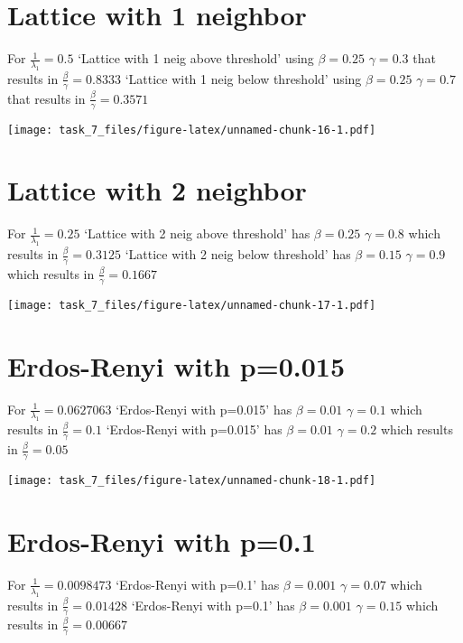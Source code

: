 \documentclass[]{article}
\begin{document}
\section{Lattice with 1 neighbor}\label{lattice-with-1-neighbor}

For \(\frac{1}{\lambda_1} = 0.5\) `Lattice with 1 neig above threshold'
using \(\beta = 0.25\) \(\gamma =0.3\) that results in
\(\frac{\beta}{\gamma} = 0.8333\) `Lattice with 1 neig below threshold'
using \(\beta = 0.25\) \(\gamma =0.7\) that results in
\(\frac{\beta}{\gamma} = 0.3571\)

\texttt{[image: task\_7\_files/figure-latex/unnamed-chunk-16-1.pdf]}

\section{Lattice with 2 neighbor}\label{lattice-with-2-neighbor}

For \(\frac{1}{\lambda_1} = 0.25\) `Lattice with 2 neig above threshold'
has \(\beta = 0.25\) \(\gamma =0.8\) which results in
\(\frac{\beta}{\gamma} = 0.3125\) `Lattice with 2 neig below threshold'
has \(\beta = 0.15\) \(\gamma =0.9\) which results in
\(\frac{\beta}{\gamma} = 0.1667\)

\texttt{[image: task\_7\_files/figure-latex/unnamed-chunk-17-1.pdf]}

\section{Erdos-Renyi with p=0.015}\label{erdos-renyi-with-p0.015}

For \(\frac{1}{\lambda_1} = 0.0627063\) `Erdos-Renyi with p=0.015' has
\(\beta = 0.01\) \(\gamma =0.1\) which results in
\(\frac{\beta}{\gamma} = 0.1\) `Erdos-Renyi with p=0.015' has
\(\beta = 0.01\) \(\gamma =0.2\) which results in
\(\frac{\beta}{\gamma} = 0.05\)

\texttt{[image: task\_7\_files/figure-latex/unnamed-chunk-18-1.pdf]}

\section{Erdos-Renyi with p=0.1}\label{erdos-renyi-with-p0.1}

For \(\frac{1}{\lambda_1} = 0.0098473\) `Erdos-Renyi with p=0.1' has
\(\beta = 0.001\) \(\gamma =0.07\) which results in
\(\frac{\beta}{\gamma} = 0.01428\) `Erdos-Renyi with p=0.1' has
\(\beta = 0.001\) \(\gamma =0.15\) which results in
\(\frac{\beta}{\gamma} = 0.00667\)
\end{document}
